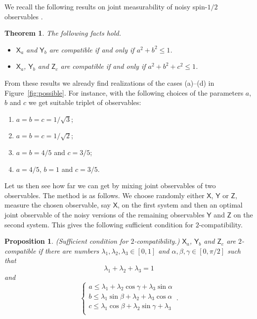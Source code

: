 \documentclass[12pt]{amsart}
\newtheorem{proposition}{Proposition}
\newtheorem{theorem}{Theorem}
\theoremstyle{definition}
\newcommand{\X}{\mathsf{X}}%
\newcommand{\Y}{\mathsf{Y}}%
\newcommand{\Z}{\mathsf{Z}}%
\begin{document}
We recall the following results on joint measurability of noisy spin-$1/2$ observables \cite{Busch86}.

\begin{theorem}
\label{prop:qubit_compatibility}
The following facts hold.
\begin{itemize}[leftmargin=*,labelsep=3mm]
\item[(1)] $\X_a$ and $\Y_b$ are compatible if and only if $a^2+b^2 \leq 1$.
\item[(2)] $\X_a$, $\Y_b$ and $\Z_c$ are compatible if and only if $a^2+b^2+c^2 \leq 1$.
\end{itemize}
\end{theorem}

From these results we already find realizations of the cases (a)--(d) in Figure~\ref{fig:possible}. 
For instance, with the following choices of the parameters $a$, $b$ and $c$ we get suitable triplet of observables:
\begin{enumerate}[leftmargin=*,labelsep=3mm,label=(\alph*)]
\item $a=b=c=1/\sqrt{3}$;
\item $a=b=c=1/\sqrt{2}$;
\item $a=b=4/5$ and $c=3/5$;
\item $a=4/5$, $b=1$ and $c=3/5$.
\end{enumerate}

Let us then see how far we can get by mixing joint observables of two observables. 
The method is as follows. 
We choose randomly either $\X$, $\Y$ or $\Z$, measure the chosen observable, say $\X$, on the first system and then an optimal joint observable of the noisy versions of the remaining observables $\Y$ and $\Z$ on the second system. 
This gives the following sufficient condition for $2$-compatibility.

\begin{proposition}\label{prop:mixing}
(Sufficient condition for $2$-compatibility.)
$\X_a$, $\Y_b$ and $\Z_c$ are $2$-compatible if there are numbers $\lambda_1,\lambda_2,\lambda_3 \in [0,1]$ and $\alpha,\beta,\gamma \in [0,\pi/2]$ such that
\begin{equation*}
\lambda_1 + \lambda_2 + \lambda_3 = 1 
\end{equation*}
and
\begin{equation}\label{eq:random}
\begin{cases}
a \leq  \lambda_1 + \lambda_2 \cos\gamma + \lambda_3 \sin\alpha \\
b \leq \lambda_1 \sin\beta + \lambda_2 + \lambda_3 \cos\alpha \\
c \leq \lambda_1 \cos\beta + \lambda_2 \sin\gamma + \lambda_3  \\
\end{cases} \, .
\end{equation}
\end{proposition}
\end{document}
